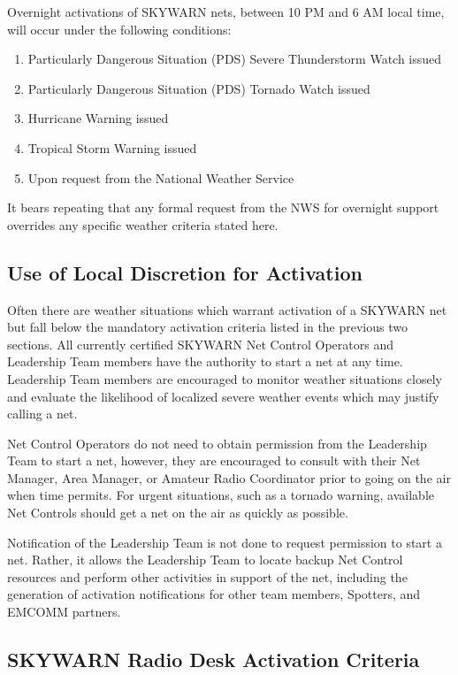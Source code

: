 \documentclass[pdflatex,letterpaper,twoside,12pt]{book}
\begin{document}
Overnight activations of SKYWARN nets, between 10 PM and 6 AM local time, will occur under the following conditions:

\begin{enumerate}
    \item Particularly Dangerous Situation (PDS) Severe Thunderstorm Watch issued
    \item Particularly Dangerous Situation (PDS) Tornado Watch issued
    \item Hurricane Warning issued
    \item Tropical Storm Warning issued
    \item Upon request from the National Weather Service
\end{enumerate}

It bears repeating that any formal request from the NWS for overnight support overrides any specific weather criteria stated here.

\subsection{Use of Local Discretion for Activation}\label{local-discretion}

Often there are weather situations which warrant activation of a SKYWARN net but fall below the mandatory activation criteria listed in the previous two sections.  All currently certified SKYWARN Net Control Operators and Leadership Team members have the authority to start a net at any time.  Leadership Team members are encouraged to monitor weather situations closely and evaluate the likelihood of localized severe weather events which may justify calling a net.

Net Control Operators do not need to obtain permission from the Leadership Team to start a net, however, they are encouraged to consult with their Net Manager, Area Manager, or Amateur Radio Coordinator prior to going on the air when time permits.  For urgent situations, such as a tornado warning, available Net Controls should get a net on the air as quickly as possible.

Notification of the Leadership Team is not done to request permission to start a net.  Rather, it allows the Leadership Team to locate backup Net Control resources and perform other activities in support of the net, including the generation of activation notifications for other team members, Spotters, and EMCOMM partners.

\subsection{SKYWARN Radio Desk Activation Criteria}\label{wx4akq-criteria}
\end{document}
